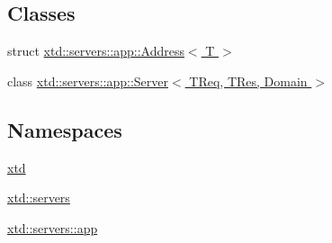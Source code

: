 \subsection*{Classes}
\begin{DoxyCompactItemize}
\item 
struct \hyperlink{structxtd_1_1servers_1_1app_1_1Address}{xtd\-::servers\-::app\-::\-Address$<$ T $>$}
\item 
class \hyperlink{classxtd_1_1servers_1_1app_1_1Server}{xtd\-::servers\-::app\-::\-Server$<$ T\-Req, T\-Res, Domain $>$}
\end{DoxyCompactItemize}
\subsection*{Namespaces}
\begin{DoxyCompactItemize}
\item 
\hyperlink{namespacextd}{xtd}
\item 
\hyperlink{namespacextd_1_1servers}{xtd\-::servers}
\item 
\hyperlink{namespacextd_1_1servers_1_1app}{xtd\-::servers\-::app}
\end{DoxyCompactItemize}
